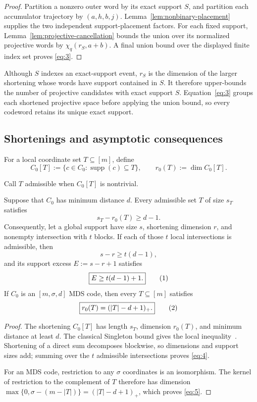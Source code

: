 \documentclass[runningheads,envcountsame,envcountsect]{llncs}
\newcommand{\supp}{\operatorname{supp}}
\newcommand{\eqnumlabel}[1]{%
  \refstepcounter{equation}\tag{\theequation}\label{#1}%
}
\begin{document}
\begin{proof}
Partition a nonzero outer word by its exact support $S$, and partition each
accumulator trajectory by $(a,h,b,j)$.  Lemma~\ref{lem:nonbinary-placement}
supplies the two independent support-placement factors.  For each fixed
support, Lemma~\ref{lem:projective-cancellation} bounds the union over its
normalized projective words by $\chi_q(r_S,a+b)$.  A final union bound over the
displayed finite index set proves \eqref{eq:3}.
\end{proof}

Although $S$ indexes an exact-support event, $r_S$ is the dimension of the
larger shortening whose words have support contained in $S$.  It therefore
upper-bounds the number of projective candidates with exact support $S$.
Equation~\eqref{eq:3} groups each shortened projective space before applying the union
bound, so every codeword retains its unique exact support.

\subsection{Shortenings and asymptotic consequences}

For a local coordinate set $T\subseteq[m]$, define
\[
    C_0[T]
      :=
    \{c\in C_0:\supp(c)\subseteq T\},
    \qquad
    r_0(T):=\dim C_0[T].
\]

Call $T$ admissible when $C_0[T]$ is nontrivial.

\begin{proposition}
Suppose that $C_0$ has minimum distance $d$.  Every admissible set $T$ of size
$s_T$ satisfies
\[
    s_T-r_0(T)\ge d-1.
\]
Consequently, let a global support have size $s$, shortening dimension $r$,
and nonempty intersection with $t$ blocks.  If each of those $t$ local
intersections is admissible, then
\[
    s-r\ge t(d-1),
\]
and its support excess $E:=s-r+1$ satisfies
\[
    \boxed{
    E\ge t(d-1)+1.
    }
    \eqnumlabel{eq:4}
\]
If $C_0$ is an $[m,\sigma,d]$ MDS code, then every $T\subseteq[m]$ satisfies
\[
    \boxed{
    r_0(T)=(|T|-d+1)_+.
    }
    \eqnumlabel{eq:5}
\]
\end{proposition}

\begin{proof}
The shortening $C_0[T]$ has length $s_T$, dimension $r_0(T)$, and minimum
distance at least $d$.  The classical Singleton bound gives the local
inequality~\cite{macwilliams}.  Shortening of a
direct sum decomposes blockwise, so dimensions and support sizes add; summing
over the $t$ admissible intersections proves \eqref{eq:4}.

For an MDS code, restriction to any $\sigma$ coordinates is an isomorphism.  The
kernel of restriction to the complement of $T$ therefore has dimension
$\max\{0,\sigma-(m-|T|)\}=(|T|-d+1)_+$, which proves \eqref{eq:5}.
\end{proof}
\end{document}
